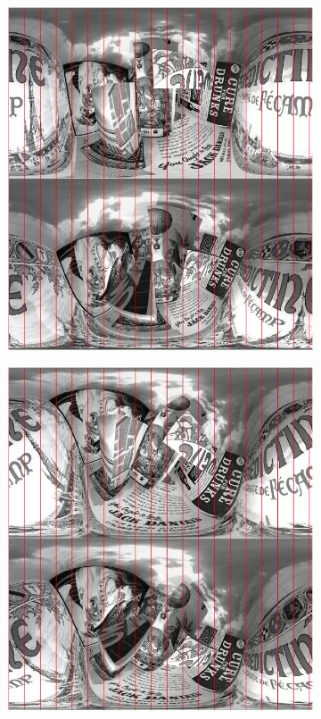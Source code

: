 \begin{figure}
	\centering
	\begin{subfigure}{0.4\linewidth}
		\includegraphics[width=\linewidth]{img/nonrectified_pair.jpg}
	\end{subfigure}
	\begin{subfigure}{0.4\linewidth}
		\includegraphics[width=\linewidth]{img/rectified_pair.jpg}

\end{subfigure}
\end{figure}
